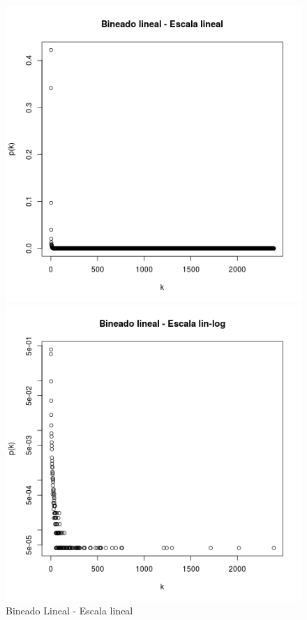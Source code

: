 \documentclass{article}
\begin{document}
\begin{figure}[!htb]
   \begin{minipage}{0.3\textwidth}
	\centering
	\includegraphics[width=1.0\linewidth]{Imagenes_P3/P3_binlin_lin.png}
	\caption{Bineado Lineal - Escala lineal}
	\label{pt3linlinlin}
   \end{minipage}\hfill
   \begin{minipage}{0.3\textwidth}
	\centering
	\includegraphics[width=1.0\linewidth]{Imagenes_P3/P3_binlin_linlog.png}

\end{minipage}
\end{figure}
\end{document}
